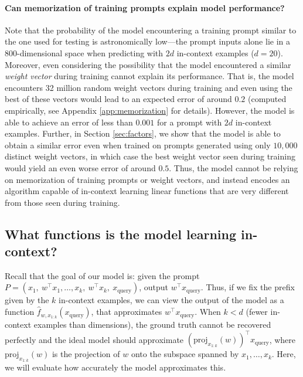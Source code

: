 \paragraph{Can memorization of training prompts explain model performance?} 
Note that the probability of the model encountering a training prompt similar to the one used for testing is astronomically low---the prompt inputs alone lie in a 800-dimensional space when predicting with $2d$ in-context examples ($d=20$).
Moreover, even considering the possibility that the model encountered a similar \emph{weight vector} during training cannot explain its performance.
That is, the model encounters 32 million random weight vectors during training and even using the best of these vectors would lead to an expected error of around $0.2$ (computed empirically, see Appendix \ref{app:memorization} for details).
 However, the model is able to achieve an error of less than $0.001$ for a prompt with $2d$ in-context examples. Further, in Section \ref{sec:factors}, we show that the model is able to obtain a similar error even when trained on prompts generated using only $10,000$  distinct weight vectors, in which case the best weight vector seen during training would yield an even worse error of around $0.5$. Thus, the model cannot be relying on memorization of training prompts or weight vectors, and instead encodes an algorithm capable of in-context learning linear functions that are very different from those seen during training.



\subsection{What functions is the model learning in-context?}
Recall that the goal of our model is: given the prompt $P=(x_1,\ w^\top x_1, \ldots, x_k,\ w^\top x_k,\ x_{\text{query}})$, output $w^\top x_\text{query}$.
Thus, if we fix the prefix given by the $k$ in-context examples, we can view the output of the model  as a function  $\hat{f}_{w,  x_{1:k}}(x_{\text{query}})$, that approximates $w^\top x_{\text{query}}$.
When $k < d$ (fewer in-context examples than dimensions), the ground truth cannot be recovered perfectly  and the ideal model should approximate $(\text{proj}_{x_{1:k}}(w))^\top x_{\text{query}}$, where $\text{proj}_{x_{1:k}}(w)$ is the projection of $w$ onto the subspace spanned by $x_1,\ldots,x_k$. Here, we will evaluate how accurately the model approximates this.

